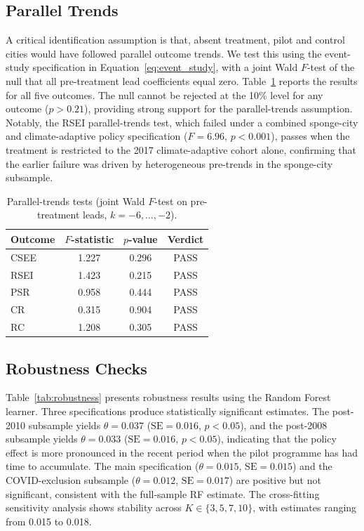 \subsection{Parallel Trends}

A critical identification assumption is that, absent treatment, pilot
and control cities would have followed parallel outcome trends. We
test this using the event-study specification in
Equation~\eqref{eq:event_study}, with a joint Wald $F$-test of the
null that all pre-treatment lead coefficients equal zero.
Table~\ref{tab:parallel_trends} reports the results for all five
outcomes. The null cannot be rejected at the 10\% level for any
outcome ($p > 0.21$), providing strong support for the parallel-trends
assumption. Notably, the RSEI parallel-trends test, which failed
under a combined sponge-city and climate-adaptive policy
specification ($F = 6.96$, $p < 0.001$), passes when the treatment is
restricted to the 2017 climate-adaptive cohort alone, confirming that
the earlier failure was driven by heterogeneous pre-trends in the
sponge-city subsample.

\begin{table}[htbp]
\centering
\caption{Parallel-trends tests (joint Wald $F$-test on pre-treatment
leads, $k = -6, \ldots, -2$).}
\label{tab:parallel_trends}
\small
\begin{tabular}{lccc}
\toprule
Outcome & $F$-statistic & $p$-value & Verdict \\
\midrule
CSEE  & 1.227 & 0.296 & PASS \\
RSEI  & 1.423 & 0.215 & PASS \\
PSR   & 0.958 & 0.444 & PASS \\
CR    & 0.315 & 0.904 & PASS \\
RC    & 1.208 & 0.305 & PASS \\
\bottomrule
\end{tabular}
\end{table}

\subsection{Robustness Checks}

Table~\ref{tab:robustness} presents robustness results using the
Random Forest learner. Three specifications produce statistically
significant estimates. The post-2010 subsample yields
$\theta = 0.037$ ($\mathrm{SE} = 0.016$, $p < 0.05$), and the
post-2008 subsample yields $\theta = 0.033$ ($\mathrm{SE} = 0.016$,
$p < 0.05$), indicating that the policy effect is more pronounced in
the recent period when the pilot programme has had time to
accumulate. The main specification ($\theta = 0.015$, $\mathrm{SE} =
0.015$) and the COVID-exclusion subsample ($\theta = 0.012$,
$\mathrm{SE} = 0.017$) are positive but not significant, consistent
with the full-sample RF estimate. The cross-fitting sensitivity
analysis shows stability across $K \in \{3, 5, 7, 10\}$, with
estimates ranging from 0.015 to 0.018.

